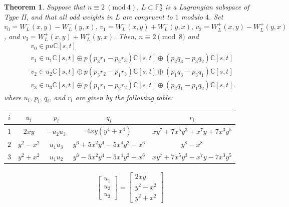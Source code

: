 \documentclass[a4paper,reqno]{amsart}
\newtheorem{theorem}{Theorem}[section]
\theoremstyle{definition}
\theoremstyle{remark} \newtheorem{remark}[theorem]{Remark}
\numberwithin{equation}{section}
\begin{document}
\begin{theorem}\label{W_L:n=2(8)}
    Suppose that \(n \equiv 2 \ (\textrm{mod}\ 4),\, L\subset \mathbb{F}_2^n\) is a Lagrangian subspace of Type II, and that all odd weights in \(L\) are congruent to \(1\) modulo \(4\). Set \(v_0 = W_L^-(x,y) - W_L^-(y,x),\, v_1 = W_L^-(x,y) + W_L^-(y,x),\, v_2 = W_L^+(x,y) - W_L^+(y,x)\), and \(v_3 = W_L^+(x,y) + W_L^+(y,x)\). Then, \(n \equiv 2 \pmod{8}\) and 
    \begin{align*}
        &v_0 \in pu\mathbb{C}[s,t] \\
        &v_1 \in u_1\mathbb{C}[s,t] \oplus p(p_3r_1 - p_2r_3)\mathbb{C}[s,t] \oplus (p_2q_3-p_3q_2)\mathbb{C}[s,t] \\
        &v_2 \in u_2\mathbb{C}[s,t] \oplus p(p_3r_2 - p_1r_3)\mathbb{C}[s,t] \oplus (p_1q_3-p_3q_1)\mathbb{C}[s,t] \\
        &v_3 \in u_3\mathbb{C}[s,t] \oplus p(p_1r_1 - p_2r_2)\mathbb{C}[s,t] \oplus (p_2q_1-p_1q_2)\mathbb{C}[s,t].
    \end{align*}
    where \(u_i,\, p_i,\, q_i\), and \(r_i\) are given by the following table:
    \begin{center}
        \begin{tabular}{|c|c|c|c|c|}
             \hline
             \(i\) & \(u_i\) & \(p_i\) & \(q_i\) & \(r_i\) \\ \hline
             \(1\) &  \(2xy\) & \(-u_2u_3\) & \(4xy(y^4+x^4)\) & \(xy^7 + 7x^5y^3 + x^7y + 7x^3y^5\) \\
             \(2\) &  \(y^2 - x^2\) & \(u_1u_3\) & \(y^6 + 5x^2y^4 - 5x^4y^2 - x^6\) & \(y^8 - x^8\) \\
             \(3\) &  \(y^2 + x^2\) & \(u_1u_2\) & \(y^6 - 5x^2y^4 - 5x^4y^2 + x^6\) & \(xy^7 + 7x^5y^3 - x^7y - 7x^3y^5\) \\
             \hline
        \end{tabular}
    \end{center}
    \iffalse
    \begin{align*}
        \begin{bmatrix}
            u_1 \\
            u_2 \\
            u_3
        \end{bmatrix}
        =
        \begin{bmatrix}
             2xy \\
            y^2 - x^2 \\
            y^2 + x^2

\end{bmatrix}
\end{align*}
\end{theorem}
\end{document}
